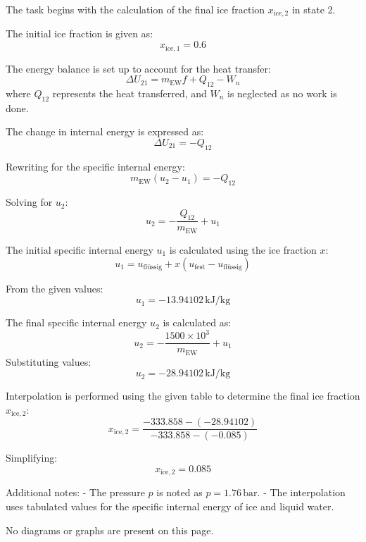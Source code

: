 The task begins with the calculation of the final ice fraction \( x_{\text{ice},2} \) in state 2.  

The initial ice fraction is given as:  
\[
x_{\text{ice},1} = 0.6
\]

The energy balance is set up to account for the heat transfer:  
\[
\Delta U_{21} = m_{\text{EW}} f + Q_{12} - W_n
\]  
where \( Q_{12} \) represents the heat transferred, and \( W_n \) is neglected as no work is done.  

The change in internal energy is expressed as:  
\[
\Delta U_{21} = -Q_{12}
\]  

Rewriting for the specific internal energy:  
\[
m_{\text{EW}} (u_2 - u_1) = -Q_{12}
\]  

Solving for \( u_2 \):  
\[
u_2 = -\frac{Q_{12}}{m_{\text{EW}}} + u_1
\]  

The initial specific internal energy \( u_1 \) is calculated using the ice fraction \( x \):  
\[
u_1 = u_{\text{flüssig}} + x (u_{\text{fest}} - u_{\text{flüssig}})
\]  

From the given values:  
\[
u_1 = -13.94102 \, \text{kJ/kg}
\]  

The final specific internal energy \( u_2 \) is calculated as:  
\[
u_2 = -\frac{1500 \times 10^3}{m_{\text{EW}}} + u_1
\]  
Substituting values:  
\[
u_2 = -28.94102 \, \text{kJ/kg}
\]  

Interpolation is performed using the given table to determine the final ice fraction \( x_{\text{ice},2} \):  
\[
x_{\text{ice},2} = \frac{-333.858 - (-28.94102)}{-333.858 - (-0.085)}
\]  

Simplifying:  
\[
x_{\text{ice},2} = 0.085
\]  

Additional notes:  
- The pressure \( p \) is noted as \( p = 1.76 \, \text{bar} \).  
- The interpolation uses tabulated values for the specific internal energy of ice and liquid water.  

No diagrams or graphs are present on this page.